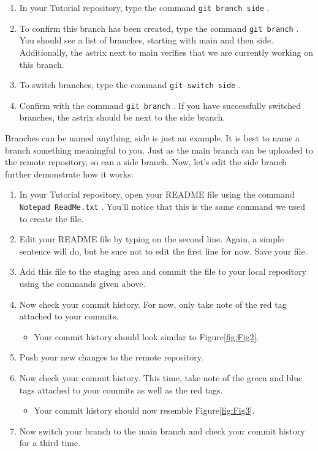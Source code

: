 \documentclass[10pt]{article}
\begin{document}
\begin{enumerate}
\item In your Tutorial repository, type the command \texttt{git branch side} . 
\item To confirm this branch has been created, type the command \texttt{git branch} . You should see a list of branches, starting with main and then side. Additionally, the astrix next to main verifies that we are currently working on this branch.
\item To switch branches, type the command \texttt{git switch side} . 
\item Confirm with the command \texttt{git branch} . If you have successfully switched branches, the astrix should be next to the side branch. 
\end{enumerate}

Branches can be named anything, side is just an example. It is best to name a branch something meaningful to you. Just as the main branch can be uploaded to the remote repository, so can a side branch. Now, let's edit the side branch further demonstrate how it works:

\begin{enumerate}
\item In your Tutorial repository, open your README file using the command \texttt{Notepad ReadMe.txt} . You'll notice that this is the same command we used to create the file.
\item Edit your README file by typing on the second line. Again, a simple sentence will do, but be sure not to edit the first line for now. Save your file.
\item Add this file to the staging area and commit the file to your local repository using the commands given above.
\item Now check your commit history. For now, only take note of the red tag attached to your commits. 
\begin{itemize}
\item Your commit history should look similar to Figure\ref{fig:Fig2}.
\end{itemize}
\item Push your new changes to the remote repository. 
\item Now check your commit history. This time, take note of the green and blue tags attached to your commits as well as the red tags.
\begin{itemize}
\item Your commit history should now resemble Figure\ref{fig:Fig3}.
\end{itemize}
\item Now switch your branch to the main branch and check your commit history for a third time.
\end{enumerate}
\end{document}
